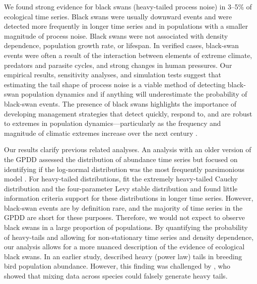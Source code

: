 We found strong evidence for black swans (heavy-tailed process noise) in 3--5\%
of ecological time series. Black swans were usually downward events and were
detected more frequently in longer time series and in populations with a
smaller magnitude of process noise. Black swans were not associated with
density dependence, population growth rate, or lifespan. In verified cases,
black-swan events were often a result of the interaction between elements of
extreme climate, predators and parasite cycles, and strong changes in human
pressures. Our empirical results, sensitivity analyses, and simulation tests
suggest that estimating the tail shape of process noise is a viable method of
detecting black-swan population dynamics and if anything will underestimate the
probability of black-swan events. The presence of black swans highlights the
importance of developing management strategies that detect quickly, respond to,
and are robust to extremes in population dynamics---particularly as the
frequency and magnitude of climatic extremes increase over the next century
\citep{easterling2000,ipcc2012}.

Our results clarify previous related analyses. An analysis with an older
version of the GPDD assessed the distribution of abundance time series but
focused on identifying if the log-normal distribution was the most frequently
parsimonious model \citep{halley2002}. For heavy-tailed distributions,
\citet{halley2002} fit the extremely heavy-tailed Cauchy distribution and the
four-parameter Levy stable distribution and found little information criteria
support for these distributions in longer time series. However, black-swan
events are by definition rare, and the majority of time series in the GPDD are
short for these purposes. Therefore, we would not expect to observe black
swans in a large proportion of populations. By quantifying the probability of
heavy-tails and allowing for non-stationary time series and density
dependence, our analysis allows for a more nuanced description of the evidence
of ecological black swans. In an earlier study, \citet{keitt1998} described
heavy (power law) tails in breeding bird population abundance. However, this
finding was challenged by \citet{allen2001}, who showed that mixing data
across species could falsely generate heavy tails.

